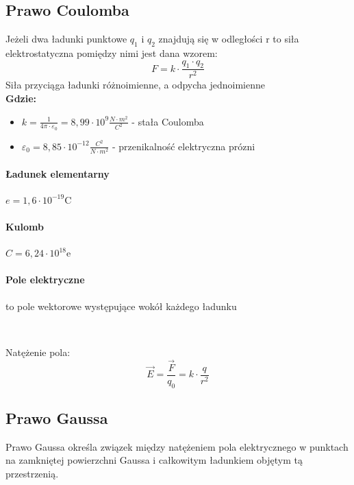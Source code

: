 \documentclass{article}
\begin{document}
        \subsection{Prawo Coulomba}
            Jeżeli dwa ładunki punktowe $q_1$ i $q_2$ znajdują się
            w odległości r to siła elektrostatyczna pomiędzy nimi jest
            dana wzorem:
            \begin{equation}
                F = k \cdotp \frac{q_1 \cdotp q_2}{r^2}
            \end{equation} 
            Siła przyciąga ładunki różnoimienne, a odpycha jednoimienne
        \\
        \textbf{Gdzie:}
        \begin{itemize}
            \item $k = \frac{1}{4 \pi \cdotp \varepsilon_0} = 
            8,99 \cdotp 10^9 \frac{N \cdotp m^2}{C^2}$
            - stała Coulomba
        
            \item $\varepsilon_0 = 8,85 \cdotp 10^{-12} \frac{C^2}{N \cdotp m^2}$
            - przenikalność elektryczna prózni
        \end{itemize}
        
        \paragraph{Ładunek elementarny }
        $e = 1,6 \cdotp 10^{-19} $C
        \paragraph{Kulomb} 
        $C = 6,24 \cdotp 10^{18} $e

        \paragraph{Pole elektryczne }
        to pole wektorowe występujące wokół każdego ładunku

        \
        
        Natężenie pola: 
        \begin{equation}
            \vec{E} = \frac{\vec{F}}{q_0} = k \cdotp \frac{q}{r^2}    
        \end{equation}
        

        \subsection{Prawo Gaussa}
            Prawo Gaussa określa związek między natężeniem pola
            elektrycznego w punktach na zamkniętej powierzchni 
            Gaussa i całkowitym ładunkiem objętym tą przestrzenią.
            \
            
\end{document}
